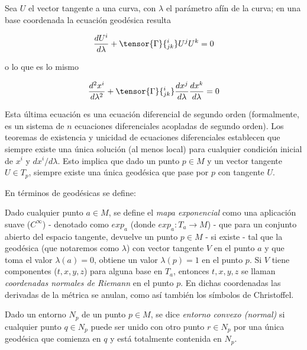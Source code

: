 Sea $U$ el vector tangente a una curva, con $\lambda$ el parámetro afín de la curva; en una base coordenada la ecuación geodésica resulta

\begin{equation*}
    \frac{dU^i}{d\lambda}+\tensor{\Gamma}{^i_{jk}}U^jU^k=0
\end{equation*}

o lo que es lo mismo

\begin{equation*}
    \frac{d^2x^i}{d\lambda^2}+\tensor{\Gamma}{^i_{jk}}\frac{dx^j}{d\lambda}\frac{dx^k}{d\lambda}=0
\end{equation*}

Esta última ecuación es una ecuación diferencial de segundo orden (formalmente, es un sistema de $n$ ecuaciones diferenciales acopladas de segundo orden). Los teoremas de existencia y unicidad de ecuaciones diferenciales establecen que siempre existe una única solución (al menos local) para cualquier condición inicial de $x^i$ y $dx^i/d\lambda$. Esto implica que dado un punto $p\in M$ y un vector tangente $U\in T_p$, siempre existe una única geodésica que pase por $p$ con tangente $U$. 

En términos de geodésicas se define:

\begin{definition}
Dado cualquier punto $a\in M$, se define el \textit{mapa exponencial} como una aplicación suave ($C^\infty$) - denotado como $exp_a$ (donde $exp_a: T_a\rightarrow M$) - que para un conjunto abierto del espacio tangente, devuelve un punto $p\in M$ - si existe - tal que la geodésica (que notaremos como $\lambda$) con vector tangente $V$ en el punto $a$ y que toma el valor $\lambda(a)=0$, obtiene un valor $\lambda(p)=1$ en el punto $p$. Si $V$ tiene componentes ($t,x,y,z$) para alguna base en $T_a$, entonces $t,x,y,z$ se llaman \textit{coordenadas normales de Riemann} en el punto $p$. En dichas coordenadas las derivadas de la métrica se anulan, como así también los símbolos de Christoffel.
\end{definition}

\begin{definition}
Dado un entorno $N_p$ de un punto $p\in M$, se dice \textit{entorno convexo (normal)} si cualquier punto $q\in N_p$ puede ser unido con otro punto $r\in N_p$ por una única geodésica que comienza en $q$ y está totalmente contenida en $N_p$.
\end{definition}
    
    

